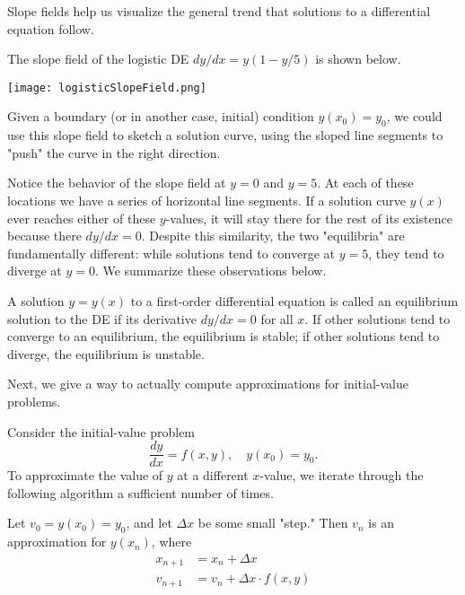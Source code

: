 \documentclass[../m082main.tex]{subfiles}
\begin{document}
Slope fields help us visualize the general trend that solutions to a differential equation follow.

\begin{example}
    The slope field of the logistic DE $dy / dx = y\left( 1 - y / 5 \right)$ is shown below.
    \begin{center}
        \texttt{[image: logisticSlopeField.png]}
    \end{center}
    Given a boundary (or in another case, initial) condition $y(x_0) = y_0$, we could use this slope field to sketch a solution curve, using the sloped line segments to "push" the curve in the right direction.
\end{example}

Notice the behavior of the slope field at $y = 0$ and $y = 5$.
At each of these locations we have a series of horizontal line segments.
If a solution curve $y(x)$ ever reaches either of these $y$-values, it will stay there for the rest of its existence because there $dy / dx = 0$.
Despite this similarity, the two "equilibria" are fundamentally different: while solutions tend to converge at $y = 5$, they tend to diverge at $y = 0$.
We summarize these observations below.

\begin{definition}
    A solution $y = y(x)$ to a first-order differential equation is called an equilibrium solution to the DE if its derivative $dy / dx = 0$ for all $x$.
    If other solutions tend to converge to an equilibrium, the equilibrium is stable; if other solutions tend to diverge, the equilibrium is unstable.
\end{definition}

Next, we give a way to actually compute approximations for initial-value problems.

\begin{definition}
    Consider the initial-value problem
    \[ \frac{dy}{dx} = f(x, y), \quad y(x_0) = y_0. \]
    To approximate the value of $y$ at a different $x$-value, we iterate through the following algorithm a sufficient number of times.

    Let $v_0 = y(x_0) = y_0$, and let $\Delta x$ be some small "step."
    Then $v_n$ is an approximation for $y(x_n)$, where
    \begin{align*}
        x_{n+1} &= x_n + \Delta x \\
        v_{n+1} &= v_n + \Delta x \cdot f(x, y)
    \end{align*}
    
\end{definition}
\end{document}

